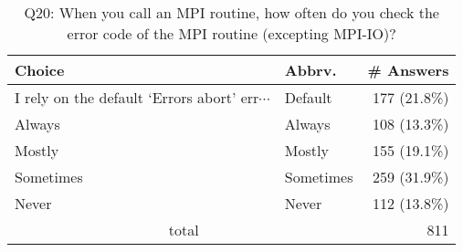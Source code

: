 \begin{table}[htb]%
\begin{center}%
\caption{Q20: When you call an MPI routine, how often do you check the error code of the MPI routine  (excepting MPI-IO)?}%
\label{tab:Q20-ans}%
\begin{tabular}{l|l|r}%
\hline%
Choice & Abbrv. & \# Answers \\%
\hline%
{\small I rely on the default ‘Errors abort’ err$\cdots$} & Default & 177 (21.8\%) \\%
Always & Always & 108 (13.3\%) \\%
Mostly & Mostly & 155 (19.1\%) \\%
Sometimes & Sometimes & 259 (31.9\%) \\%
Never & Never & 112 (13.8\%) \\%
\hline%
\multicolumn{2}{c}{total} & 811 \\%
\hline%
\end{tabular}%
\end{center}%
\end{table}%
